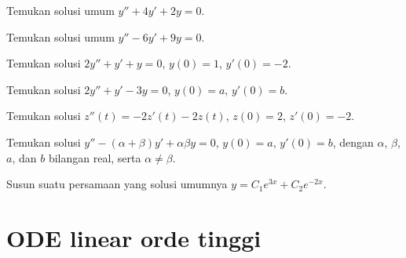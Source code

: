 \setcounter{exercise}{100}

\begin{exercise}
Temukan solusi umum $y''+4y'+2y=0$.
\end{exercise}

\begin{exercise}
Temukan solusi umum $y''-6y'+9y=0$.
\end{exercise}

\begin{exercise}
Temukan solusi $2y''+y'+y=0$, $y(0) = 1$, $y'(0)=-2$.
\end{exercise}

\begin{exercise}
Temukan solusi $2y''+y'-3y=0$, $y(0) = a$, $y'(0)=b$.
\end{exercise}

\begin{exercise}
Temukan solusi $z''(t) = -2z'(t)-2z(t)$, $z(0) = 2$, $z'(0)= -2$.
\end{exercise}

\begin{exercise}
Temukan solusi $y''-(\alpha+\beta) y' + \alpha \beta y=0$, $y(0) = a$, $y'(0)=b$, dengan $\alpha$, $\beta$, $a$, dan $b$ bilangan real, serta $\alpha \neq \beta$.
\end{exercise}

\begin{exercise}
Susun suatu persamaan yang solusi umumnya $y = C_1 e^{3x} + C_2 e^{-2x}$.
\end{exercise}


\sectionnewpage
\section{ODE linear orde tinggi} \label{sec:hol}



